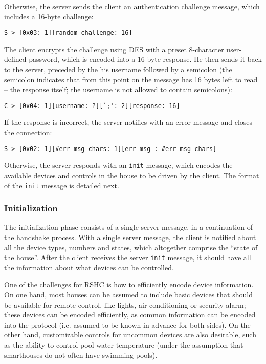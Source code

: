 \noindent
Otherwise, the server sends the client an authentication challenge message, which includes a 16-byte challenge:

\begin{verbatim}
S > [0x03: 1][random-challenge: 16]
\end{verbatim}

\noindent
The client encrypts the challenge using DES with a preset 8-character user-defined password, which is encoded into a 16-byte response. He then sends it back to the server, preceded by the his username followed by a semicolon (the semicolon indicates that from this point on the message has 16 bytes left to read -- the response itself; the username is not allowed to contain semicolons):

\begin{verbatim}
C > [0x04: 1][username: ?][`;': 2][response: 16]
\end{verbatim}

\noindent
If the response is incorrect, the server notifies with an error message and closes the connection:
\begin{verbatim}
S > [0x02: 1][#err-msg-chars: 1][err-msg : #err-msg-chars]
\end{verbatim}

\noindent
Otherwise, the server responds with an {\tt init} message, which encodes the available devices and controls in the house to be driven by the client. The format of the {\tt init} message is detailed next.

\subsubsection{Initialization}
\label{sec:pdus:pdu:init}

The initialization phase consists of a single server message, in a continuation of the handshake process. With a single server message, the client is notified about all the device types, numbers and states, which altogether comprise the ``state of the house''. After the client receives the server {\tt init} message, it should have all the information about what devices can be controlled.

One of the challenges for RSHC is how to efficiently encode device information. On one hand, most houses can be assumed to include basic devices that should be available for remote control, like lights, air-conditioning or security alarm; these devices can be encoded efficiently, as common information can be encoded into the protocol (i.e. assumed to be known in advance for both sides). On the other hand, customizable controls for uncommon devices are also desirable, such as the ability to control pool water temperature (under the assumption that smarthouses do not often have swimming pools).

